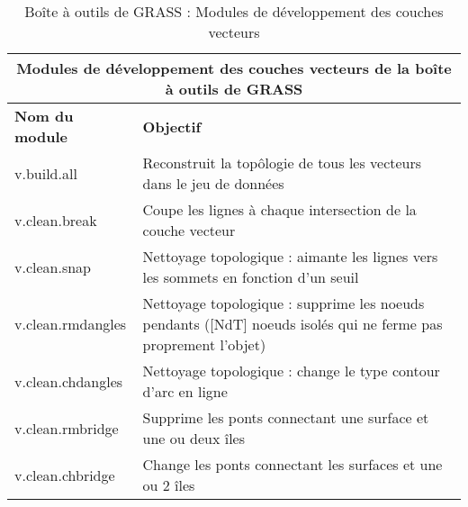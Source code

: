 \begin{table}[ht]
\centering
\caption{Bo\^ite \`a outils de GRASS : Modules de d\'eveloppement des couches vecteurs}\medskip
 \begin{tabular}{|p{4cm}|p{12cm}|}
  \hline \multicolumn{2}{|c|}{\textbf{Modules de d\'eveloppement des couches vecteurs de la bo\^ite \`a outils de GRASS}} \\
  \hline \textbf{Nom du module} & \textbf{Objectif} \\
  \hline v.build.all & Reconstruit la top\^ologie de tous les vecteurs dans le jeu de donn\'ees\\
  \hline v.clean.break & Coupe les lignes \`a chaque intersection de la couche vecteur\\
  \hline v.clean.snap & Nettoyage topologique : aimante les lignes vers les sommets en fonction d'un seuil\\
  \hline v.clean.rmdangles & Nettoyage topologique : supprime les noeuds pendants ([NdT] noeuds isol\'es qui ne ferme pas proprement l'objet) \\
  \hline v.clean.chdangles & Nettoyage topologique : change le type contour d'arc en ligne \\
  \hline v.clean.rmbridge & Supprime les ponts connectant une surface et une ou deux \^iles\\
  \hline v.clean.chbridge & Change les ponts connectant les surfaces et une ou 2 \^iles \\

\end{tabular}
\end{table}
